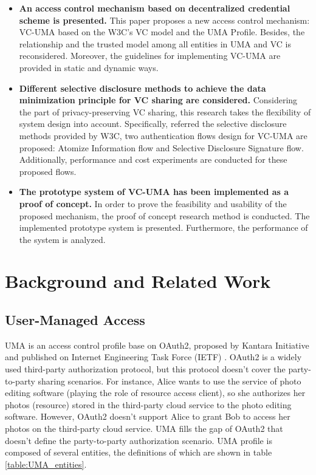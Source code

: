 \documentclass[conference, dvipdfmx]{IEEEtran} %
\begin{document}
\begin{sloppypar}
\begin{itemize}
  \item \textbf{An access control mechanism based on decentralized credential scheme is presented.}	This paper proposes a new access control mechanism: VC-UMA based on the W3C's VC model\cite{VC_model} and the UMA Profile\cite{UMA}. Besides, the relationship and the trusted model among all entities in UMA and VC is reconsidered. Moreover, the guidelines for implementing VC-UMA are provided in static and dynamic ways.
  \item \textbf{Different selective disclosure methods to achieve the data minimization principle for VC sharing are considered.} Considering the part of privacy-preserving VC sharing, this research takes the flexibility of system design into account. Specifically, referred the selective disclosure methods provided by W3C\cite{VC_Implementation_Guidelines}, two authentication flows design for VC-UMA are proposed: Atomize Information flow and Selective Disclosure Signature flow. Additionally, performance and cost experiments are conducted for these proposed flows.
  \item \textbf{The prototype system of VC-UMA has been implemented as a proof of concept.}
  In order to prove the feasibility and usability of the proposed mechanism, the proof of concept research method is conducted. The implemented prototype system is presented. Furthermore, the performance of the system is analyzed.
\end{itemize}


\section{Background and Related Work}
\label{sec:back}
\subsection{User-Managed Access}


UMA is an access control profile base on OAuth2\cite{OAuth2}, proposed by Kantara Initiative and published on Internet Engineering Task Force (IETF) \cite{UMA}. 
OAuth2 is a  widely used third-party authorization protocol, but this protocol doesn't cover the party-to-party sharing scenarios.
For instance, Alice wants to use the service of photo editing software (playing the role of resource access client), so she authorizes her photos (resource) stored in the third-party cloud service to the photo editing software. However, OAuth2 doesn't support Alice to grant Bob to access her photos on the third-party cloud service.
UMA fills the gap of OAuth2 that doesn't define the party-to-party authorization scenario. 
UMA profile is composed of several entities, the definitions of which are shown in table \ref{table:UMA_entities}.


\end{sloppypar}
\end{document}

